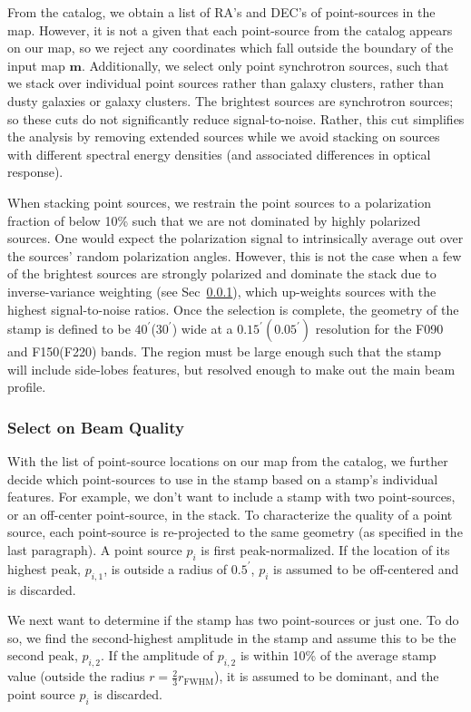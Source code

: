 From the catalog, we obtain a list of RA's and DEC's of point-sources in the map.  However, it is not a given that each point-source from the catalog appears on our map, so we reject any coordinates which fall outside the boundary of the input map $\mathbf m$.  Additionally, we select only point synchrotron sources, such that we stack over individual point sources rather than galaxy clusters, rather than dusty galaxies or galaxy clusters.  The brightest sources are synchrotron sources; so these cuts do not significantly reduce signal-to-noise.  Rather, this cut simplifies the analysis by removing extended sources while we avoid stacking on sources with different spectral energy densities (and associated differences in optical response).

When stacking point sources, we restrain the point sources to a polarization fraction of below 10\% such that we are not dominated by highly polarized sources.  One would expect the polarization signal to intrinsically average out over the sources' random polarization angles.  However, this is not the case when a few of the brightest sources are strongly polarized and dominate the stack due to inverse-variance weighting (see Sec~\ref{subsubsec:beamqual_sel}), which up-weights sources with the highest signal-to-noise ratios.  Once the selection is complete, the geometry of the stamp is defined to be $40^{\prime}$($30^{\prime}$) wide at a $0.15^{\prime}(0.05^{\prime})$ resolution for the F090 and F150(F220) bands.  The region must be large enough such that the stamp will include side-lobes features, but resolved enough to make out the main beam profile.

\subsubsection{Select on Beam Quality}
\label{subsubsec:beamqual_sel}
With the list of point-source locations on our map from the catalog, we further decide which point-sources to use in the stamp based on a stamp's individual features.  For example, we don't want to include a stamp with two point-sources, or an off-center point-source, in the stack.  To characterize the quality of a point source, each point-source is re-projected to the same geometry (as specified in the last paragraph).  A point source $p_i$ is first peak-normalized.  If the location of its highest peak, $p_{i,1}$, is outside a radius of $0.5^{\prime}$, $p_i$ is assumed to be off-centered and is discarded.  

We next want to determine if the stamp has two point-sources or just one.  To do so, we find the second-highest amplitude in the stamp and assume this to be the second peak, $p_{i,2}$.  If the amplitude of $p_{i,2}$ is within 10\% of the average stamp value (outside the radius $r=\frac{2}{3}r_{\text{FWHM}}$), it is assumed to be dominant, and the point source $p_i$ is discarded.

